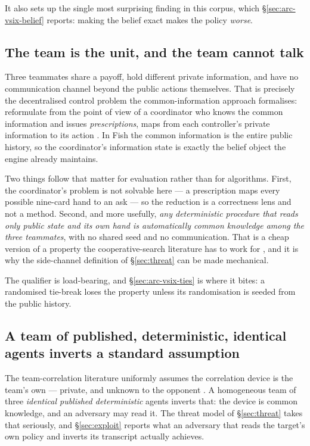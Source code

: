 It also sets up the single most surprising finding in this corpus, which
\S\ref{sec:arc-vsix-belief} reports: making the belief exact makes the policy \emph{worse}.

\subsection{The team is the unit, and the team cannot talk}
\label{sec:domain-team}

Three teammates share a payoff, hold different private information, and have no communication
channel beyond the public actions themselves. That is precisely the decentralised control problem
the common-information approach formalises: reformulate from the point of view of a coordinator who
knows the common information and issues \emph{prescriptions}, maps from each controller's private
information to its action \cite{nayyar2013common}. In Fish the common information is the entire
public history, so the coordinator's information state is exactly the belief object the engine
already maintains.

Two things follow that matter for evaluation rather than for algorithms. First, the coordinator's
problem is not solvable here --- a prescription maps every possible nine-card hand to an ask --- so
the reduction is a correctness lens and not a method. Second, and more usefully, \emph{any
deterministic procedure that reads only public state and its own hand is automatically common
knowledge among the three teammates}, with no shared seed and no communication. That is a cheap
version of a property the cooperative-search literature has to work for \cite{lerer2020sparta}, and
it is why the side-channel definition of \S\ref{sec:threat} can be made mechanical.

The qualifier is load-bearing, and \S\ref{sec:arc-vsix-ties} is where it bites: a randomised
tie-break loses the property unless its randomisation is seeded from the public history.

\subsection{A team of published, deterministic, identical agents inverts a standard assumption}
\label{sec:domain-inverted}

The team-correlation literature uniformly assumes the correlation device is the team's own ---
private, and unknown to the opponent \cite{celli-gatti,farina-collusion,zhang-tbdag}. A homogeneous
team of three \emph{identical published deterministic} agents inverts that: the device is common
knowledge, and an adversary may read it. The threat model of \S\ref{sec:threat} takes that
seriously, and \S\ref{sec:exploit} reports what an adversary that reads the target's own policy and
inverts its transcript actually achieves.

